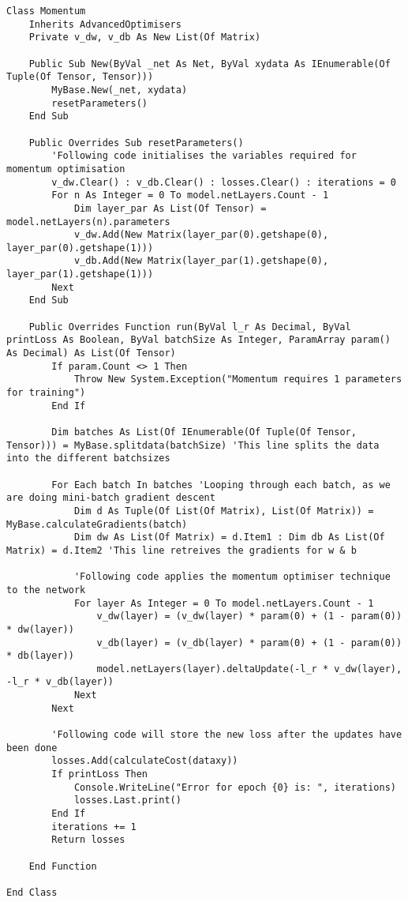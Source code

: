 \begin{verbatim}
Class Momentum
    Inherits AdvancedOptimisers
    Private v_dw, v_db As New List(Of Matrix)

    Public Sub New(ByVal _net As Net, ByVal xydata As IEnumerable(Of Tuple(Of Tensor, Tensor)))
        MyBase.New(_net, xydata)
        resetParameters()
    End Sub

    Public Overrides Sub resetParameters()
        'Following code initialises the variables required for momentum optimisation
        v_dw.Clear() : v_db.Clear() : losses.Clear() : iterations = 0
        For n As Integer = 0 To model.netLayers.Count - 1
            Dim layer_par As List(Of Tensor) = model.netLayers(n).parameters
            v_dw.Add(New Matrix(layer_par(0).getshape(0), layer_par(0).getshape(1)))
            v_db.Add(New Matrix(layer_par(1).getshape(0), layer_par(1).getshape(1)))
        Next
    End Sub

    Public Overrides Function run(ByVal l_r As Decimal, ByVal printLoss As Boolean, ByVal batchSize As Integer, ParamArray param() As Decimal) As List(Of Tensor)
        If param.Count <> 1 Then
            Throw New System.Exception("Momentum requires 1 parameters for training")
        End If

        Dim batches As List(Of IEnumerable(Of Tuple(Of Tensor, Tensor))) = MyBase.splitdata(batchSize) 'This line splits the data into the different batchsizes

        For Each batch In batches 'Looping through each batch, as we are doing mini-batch gradient descent
            Dim d As Tuple(Of List(Of Matrix), List(Of Matrix)) = MyBase.calculateGradients(batch)
            Dim dw As List(Of Matrix) = d.Item1 : Dim db As List(Of Matrix) = d.Item2 'This line retreives the gradients for w & b

            'Following code applies the momentum optimiser technique to the network
            For layer As Integer = 0 To model.netLayers.Count - 1
                v_dw(layer) = (v_dw(layer) * param(0) + (1 - param(0)) * dw(layer))
                v_db(layer) = (v_db(layer) * param(0) + (1 - param(0)) * db(layer))
                model.netLayers(layer).deltaUpdate(-l_r * v_dw(layer), -l_r * v_db(layer))
            Next
        Next

        'Following code will store the new loss after the updates have been done
        losses.Add(calculateCost(dataxy))
        If printLoss Then
            Console.WriteLine("Error for epoch {0} is: ", iterations)
            losses.Last.print()
        End If
        iterations += 1
        Return losses

    End Function

End Class
\end{verbatim}
